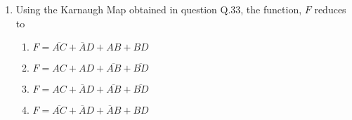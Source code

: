 \documentclass[journal]{IEEEtran}
\begin{document}
\begin{enumerate}
\begin{enumerate}
$$\begin{array}{|c|c|c|c|c|}
                \hline
                    \begin{tikzpicture}
        \node at (0.1,0.1) {CD};
        \draw[thick] (0.4,-0.4) -- (-1.2,0.4);
        \node[anchor=south east] at (-0.5,-0.5) {AB};
    \end{tikzpicture}
                & 00 & 01 & 11 & 10 \\
                \hline
                00 & 1 & X & 1 & X \\
                \hline
                01 & X & 1 & X & 1 \\
                \hline
                11 & 1 & X & X & X \\
                \hline
                10 & X & 1 & X & 1 \\
                \hline
            \end{array}
            $$
            \item $$
                \begin{array}{|c|c|c|c|c|}
                \hline
                    \begin{tikzpicture}
        \node at (0.1,0.1) {CD};
        \draw[thick] (0.4,-0.4) -- (-1.2,0.4);
        \node[anchor=south east] at (-0.5,-0.5) {AB};
    \end{tikzpicture}
                & 00 & 01 & 11 & 10 \\
                \hline
                00 & 1 & 1 & X & X \\
                \hline
                01 & X & X & X & X \\
                \hline
                11 & X & 1 & 1 & 1 \\
                \hline
                10 & X & 1 & 1 & X \\
                \hline
            \end{array}
            $$
        \end{enumerate}

    \item Using the Karnaugh Map obtained in question Q.33, the function, $F$ reduces to 
        \begin{enumerate}
            \item $F=\overline{AC}+\overline{A}D+AB+BD$
            \item $F=AC+AD+\overline{AB}+\overline{BD}$
            \item $F=AC+\overline{A}D+\overline{AB}+\overline{BD}$
            \item $F=\overline{AC}+\overline{A}D+\overline{A}B+BD$
        \end{enumerate}

\end{enumerate}
\end{document}
